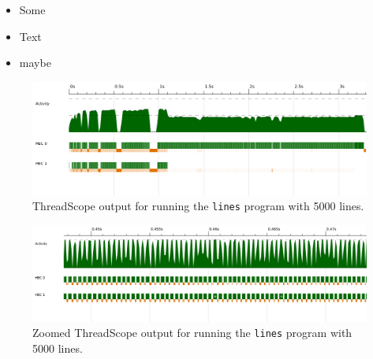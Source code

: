 \documentclass[12pt]{beamer}
\begin{document}
\begin{frame}
  \begin{itemize}
  \item Some
  \item Text
  \item maybe
  \end{itemize}
\end{frame}

\begin{frame}
 \begin{figure}[H]
  \centering
  \includegraphics[width=\linewidth]{../threadscope/fillorder/lines}
  \caption{ThreadScope output for running the \texttt{lines} program with 5000 lines.}
  \label{fig:lines-fillorder}
\end{figure}

\begin{figure}[H]
  \centering
  \includegraphics[width=\linewidth]{../threadscope/fillorder/lines-zoom}
  \caption{Zoomed ThreadScope output for running the \texttt{lines} program with 5000 lines.}
  \label{fig:lines-fillorder-zoom}
\end{figure}

\end{frame}
\end{document}
